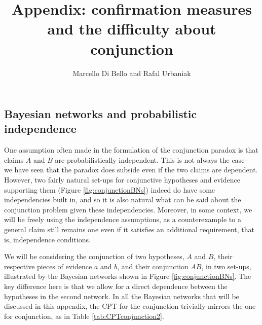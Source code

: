 \documentclass[
  10pt,
  dvipsnames,enabledeprecatedfontcommands]{scrartcl}
\title{Appendix: confirmation measures and the difficulty about
conjunction}
\author{Marcello Di Bello and Rafal Urbaniak}
\date{}
\begin{document}
\maketitle

\tableofcontents

\hypertarget{bayesian-networks-and-probabilistic-independence}{%
\subsection*{Bayesian networks and probabilistic
independence}\label{bayesian-networks-and-probabilistic-independence}}

One assumption often made in the formulation of the conjunction paradox
is that claims \(A\) and \(B\) are probabilistically independent. This
is not always the case---we have seen that the paradox does subside even
if the two claims are dependent. However, two fairly natural set-ups for
conjunctive hypotheses and evidence supporting them (Figure
\ref{fig:conjunctionBNs}) indeed do have some independencies built in,
and so it is also natural what can be said about the conjunction problem
given these independencies. Moreover, in some context, we will be freely
using the independence assumptions, as a counterexample to a general
claim still remains one even if it satisfies an additional requirement,
that is, independence conditions.

We will be considering the conjunction of two hypotheses, \(A\) and
\(B\), their respective pieces of evidence \(a\) and \(b\), and their
conjunction \(AB\), in two set-ups, illustrated by the Bayesian networks
shown in Figure \ref{fig:conjunctionBNs}. The key difference here is
that we allow for a direct dependence between the hypotheses in the
second network. In all the Bayesian networks that will be discussed in
this appendix, the CPT for the conjunction trivially mirrors the one for
conjunction, as in Table \ref{tab:CPTconjunction2}.

\vspace{1mm}
\footnotesize

\normalsize
\end{document}
